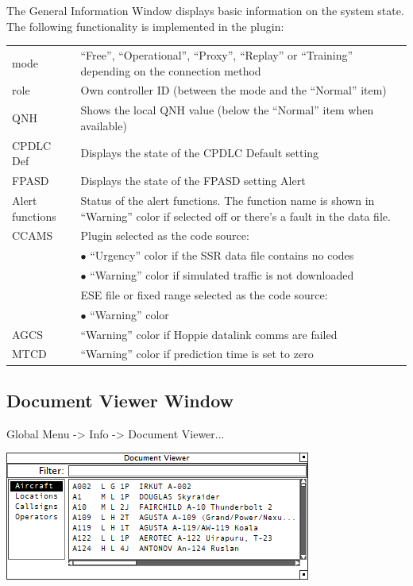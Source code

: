 \documentclass[11pt,a4paper,oldfontcommands]{memoir}
\begin{document}
The General Information Window displays basic information on the system state. The following functionality is implemented in the plugin:

\begin{tabular}{l l}
    mode                & “Free”, “Operational”, “Proxy”, “Replay” or “Training” depending on the connection method \\
    role                & Own controller ID (between the mode and the “Normal” item)\\
    QNH                 & Shows the local QNH value (below the “Normal” item when available)\\
    CPDLC Def           & Displays the state of the CPDLC Default setting\\
    FPASD               & Displays the state of the FPASD setting Alert\\
    Alert functions     & Status of the alert functions. The function name is shown in “Warning” color if selected off or there’s a fault in the data file.\\
    CCAMS               & Plugin selected as the code source:\\
                        & $\bullet$ “Urgency” color if the SSR data file contains no codes\\
                        & $\bullet$ “Warning” color if simulated traffic is not downloaded\\
                        & ESE file or fixed range selected as the code source:\\
                        & $\bullet$ “Warning” color\\
    AGCS                & “Warning” color if Hoppie datalink comms are failed\\
    MTCD                & “Warning” color if prediction time is set to zero    \\
\end{tabular}

\subsection{Document Viewer Window}
\label{win:dvw}

Global Menu -> Info -> Document Viewer...

\includegraphics{img/doc.png}
\end{document}

